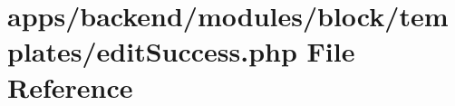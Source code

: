 \hypertarget{backend_2modules_2block_2templates_2edit_success_8php}{\section{apps/backend/modules/block/templates/edit\-Success.php File Reference}
\label{backend_2modules_2block_2templates_2edit_success_8php}
}
